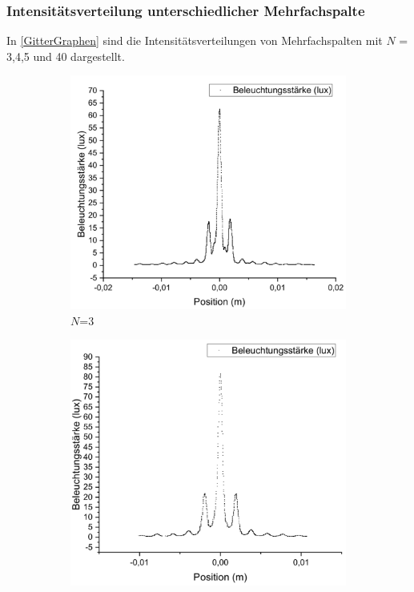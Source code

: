 \documentclass[
	a4paper,
	12pt,
	pagesize,
	ngerman
]{scrartcl}
\begin{document}
	\subsubsection{Intensitätsverteilung unterschiedlicher Mehrfachspalte} 
	In \cref{GitterGraphen} sind die Intensitätsverteilungen von Mehrfachspalten mit $N$ = 3,4,5 und 40 dargestellt. 
	\label{Maximaintensitäten}

	\begin{figure}[H]
		\centering
		\begin{subfigure}{.5\textwidth}
			\centering
			\includegraphics[width=1\linewidth]{GitterN3ZOOM}
			\caption{$N$=3}	
		\end{subfigure}%
		\begin{subfigure}{.5\textwidth}
			\centering
			\includegraphics[width=1\linewidth]{GitterN4ZOOM}

\end{subfigure}
\end{figure}
\end{document}
